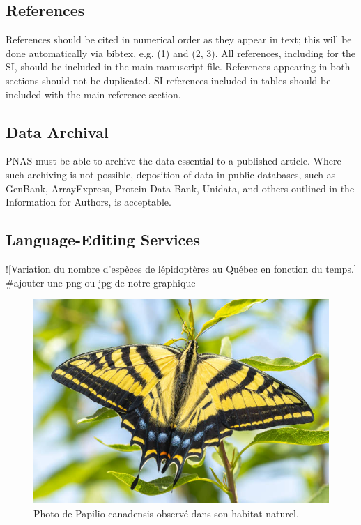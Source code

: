 \documentclass[9pt,twocolumn,twoside,]{pnas-new}
\begin{document}
\subsection*{References}\label{references}

References should be cited in numerical order as they appear in text;
this will be done automatically via bibtex, e.g. (1) and (2, 3). All
references, including for the SI, should be included in the main
manuscript file. References appearing in both sections should not be
duplicated. SI references included in tables should be included with the
main reference section.

\subsection*{Data Archival}\label{data-archival}

PNAS must be able to archive the data essential to a published article.
Where such archiving is not possible, deposition of data in public
databases, such as GenBank, ArrayExpress, Protein Data Bank, Unidata,
and others outlined in the Information for Authors, is acceptable.

\subsection*{Language-Editing Services}\label{language-editing-services}

!{[}Variation du nombre d'espèces de lépidoptères au Québec en fonction
du temps.{}{]} \#ajouter une png ou jpg de notre graphique

\begin{figure}
\centering
\includegraphics{Papilio_canadensis.png}
\caption{Photo de Papilio canadensis observé dans son habitat
naturel.{}}
\end{figure}
\end{document}
